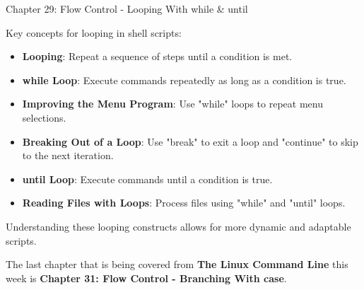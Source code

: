 \begin{notes}{Chapter 29: Flow Control - Looping With while \& until}
\begin{highlight}
    \end{highlight}
    
    \begin{highlight}
    
        Key concepts for looping in shell scripts:
        
        \begin{itemize}
            \item \textbf{Looping}: Repeat a sequence of steps until a condition is met.
            \item \textbf{while Loop}: Execute commands repeatedly as long as a condition is true.
            \item \textbf{Improving the Menu Program}: Use "while" loops to repeat menu selections.
            \item \textbf{Breaking Out of a Loop}: Use "break" to exit a loop and "continue" to skip to the next iteration.
            \item \textbf{until Loop}: Execute commands until a condition is true.
            \item \textbf{Reading Files with Loops}: Process files using "while" and "until" loops.
        \end{itemize}
        
        Understanding these looping constructs allows for more dynamic and adaptable scripts.
    
    \end{highlight}
\end{notes}

The last chapter that is being covered from \textbf{The Linux Command Line} this week is \textbf{Chapter 31: Flow Control - Branching With case}.

